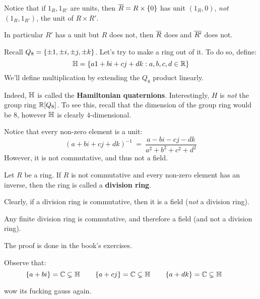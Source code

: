 Notice that if $ 1_{R}, 1_{R'} $ are units, then $ \overline{R} = R \times \left\{{0}\right\} $ has
unit $ (1_{R}, 0) $, \textit{not} $ (1_{R}, 1_{R'}) $, the unit of $ R \times R' $.

In particular $ R' $ has a unit but $ R $ does not, then $ \overline{R} $ does and $ \overline{R'} $
does not.


Recall $ Q_{8} = \left\{{\pm 1, \pm i, \pm j, \pm k}\right\} $.
Let's try to make a ring out of it.
To do so, define:
\begin{equation*}
    \mathbb{H} = \left\{{a1 + bi + cj + dk : a, b, c, d \in \mathbb{R}}\right\}
\end{equation*}
We'll define multiplication by extending the $ Q_{8} $ product linearly.

Indeed, $ \mathbb{H} $ is called the \textbf{Hamiltonian quaternions}.
Interestingly, $ H $ is \textit{not} the group ring $ \mathbb{R}[Q_{8}] $.
To see this, recall that the dimension of the group ring would be 8,
however $ \mathbb{H} $ is clearly $ 4 $-dimensional.

Notice that every non-zero element is a unit:
\begin{equation*}
    (a + bi + cj + dk)^{-1} \ = \ \frac{a - bi - cj - dk}{a^{2} + b^{2} + c^{2} + d^{2}}
\end{equation*}
However, it is not commutative, and thus not a field.

\begin{defn}
    Let $ R $ be a ring.
    If $ R $ is not commutative and every non-zero element has an inverse, then the ring is
    called a \textbf{division ring}.
\end{defn}
Clearly, if a division ring is commutative, then it is a field (\textit{not} a division ring).

\begin{thm}[title=Wedderburn]
    Any finite division ring is commutative, and therefore a field (and not a division ring).
\end{thm}

\begin{pf}
    The proof is done in the book's exercises.
\end{pf}

Observe that:
\begin{equation*}
    \left\{{a+bi}\right\} = \mathbb{C} \subsetneq \mathbb{H} \qquad
    \left\{{a+cj}\right\} = \mathbb{C} \subsetneq \mathbb{H} \qquad
    \left\{{a+dk}\right\} = \mathbb{C} \subsetneq \mathbb{H} \qquad
\end{equation*}

wow its fucking gauss again.
